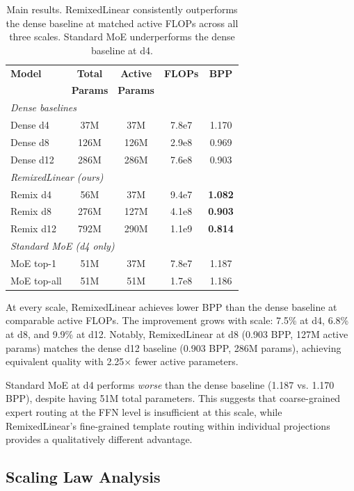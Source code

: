 \documentclass[11pt]{article}
\begin{document}
\begin{table}[t]
\centering
\small
\caption{Main results. RemixedLinear consistently outperforms the dense baseline at matched active FLOPs across all three scales. Standard MoE underperforms the dense baseline at d4.}
\label{tab:main}
\begin{tabular}{@{}lcccc@{}}
\toprule
\textbf{Model} & \textbf{Total} & \textbf{Active} & \textbf{FLOPs} & \textbf{BPP} \\
& \textbf{Params} & \textbf{Params} & & \\
\midrule
\multicolumn{5}{l}{\textit{Dense baselines}} \\
\quad Dense d4 & 37M & 37M & 7.8e7 & 1.170 \\
\quad Dense d8 & 126M & 126M & 2.9e8 & 0.969 \\
\quad Dense d12 & 286M & 286M & 7.6e8 & 0.903 \\
\midrule
\multicolumn{5}{l}{\textit{RemixedLinear (ours)}} \\
\quad Remix d4 & 56M & 37M & 9.4e7 & \textbf{1.082} \\
\quad Remix d8 & 276M & 127M & 4.1e8 & \textbf{0.903} \\
\quad Remix d12 & 792M & 290M & 1.1e9 & \textbf{0.814} \\
\midrule
\multicolumn{5}{l}{\textit{Standard MoE (d4 only)}} \\
\quad MoE top-1 & 51M & 37M & 7.8e7 & 1.187 \\
\quad MoE top-all & 51M & 51M & 1.7e8 & 1.186 \\
\bottomrule
\end{tabular}
\end{table}

At every scale, RemixedLinear achieves lower BPP than the dense baseline at comparable active FLOPs. The improvement grows with scale: 7.5\% at d4, 6.8\% at d8, and 9.9\% at d12. Notably, RemixedLinear at d8 (0.903 BPP, 127M active params) matches the dense d12 baseline (0.903 BPP, 286M params), achieving equivalent quality with 2.25$\times$ fewer active parameters.

Standard MoE at d4 performs \emph{worse} than the dense baseline (1.187 vs. 1.170 BPP), despite having 51M total parameters. This suggests that coarse-grained expert routing at the FFN level is insufficient at this scale, while RemixedLinear's fine-grained template routing within individual projections provides a qualitatively different advantage.

\subsection{Scaling Law Analysis}
\end{document}
